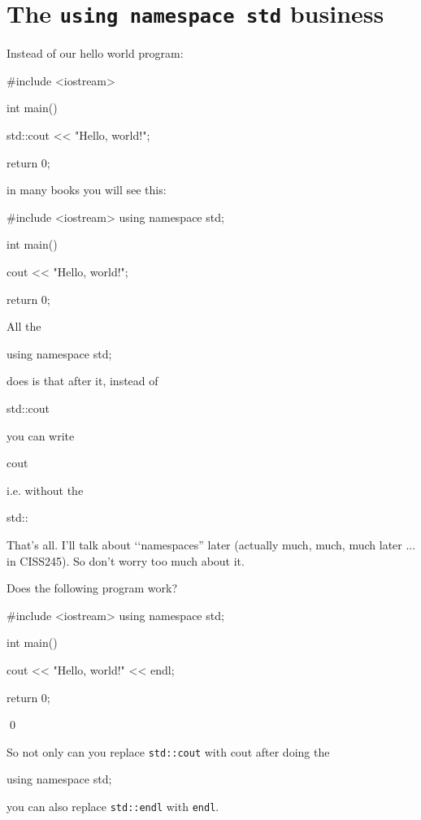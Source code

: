 \newpage\section{The \texttt{using namespace std} business}

Instead of our hello world program:
\begin{console}
#include <iostream>

int main()
{
    std::cout << "Hello, world!\n";

    return 0;
}
\end{console}
in many books you will see this:
\begin{console}
#include <iostream>
using namespace std;

int main()
{
    cout << "Hello, world!\n";

    return 0;
}
\end{console}

All the 
\begin{console}[frame=none]

        using namespace std;

\end{console}
does is that after it, instead of
\begin{console}[frame=none]

        std::cout

\end{console}
you can write
\begin{console}[frame=none]

        cout

\end{console}
i.e. without the 
\begin{console}[frame=none]

	std::

\end{console}
That's all. I'll talk about 
\lq\lq namespaces'' later 
(actually much, much, much later ... in CISS245). 
So don't worry too much about it. 


\begin{ex}
Does the following program work?
\begin{console}
#include <iostream>
using namespace std;

int main()
{
    cout << "Hello, world!" << endl;

    return 0;
}
\end{console}
\qed
\end{ex}


So not only can you replace \verb!std::cout! with cout after doing the 
\begin{console}[frame=none]

    using namespace std;

\end{console}
you can also replace \verb!std::endl! with \verb!endl!.





